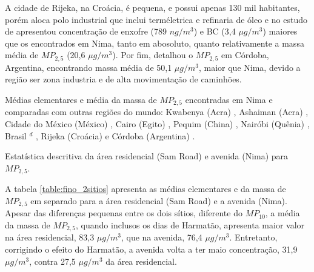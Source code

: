 A cidade de Rijeka, na Croácia, é pequena, e possui apenas 130 mil habitantes, 
porém aloca polo industrial que inclui terméletrica e refinaria de óleo
e no estudo de \citep{ivovsevic2015} apresentou concentração de enxofre
(789 $ng / m^3$) e BC (3,4 $\mu g / m^3$) maiores que os encontrados em Nima, 
tanto em abosoluto, quanto relativamente a massa média de $MP_{2,5}$ 
(20,6 $\mu g / m^3$). 
Por fim, \citet{achad2014} detalhou o $MP_{2,5}$ em Córdoba, Argentina, 
encontrando massa média de 50,1 $\mu g / m^3$, maior que Nima, devido a região
ser zona industria e de alta movimentação de caminhões.   

\begin{landscape}
  \begin{table}[H]
    \centering
    
    \caption{Médias elementares e média da massa de $MP_{2,5}$ encontradas
             em Nima e comparadas com outras regiões do mundo:
             Kwabenya (Acra) \citep{aboh2009},
             Ashaiman (Acra) \citep{ofosu2012},
             Cidade do México (México) \citep{diaz2014},
             Cairo (Egito) \citep{boman2013},
             Pequim (China) \citep{yang2011},
             Nairóbi (Quênia)  \citep{gaita2014},
             Brasil $^d$ \citep{andrade2012urban},
             Rijeka (Croácia) \citep{ivovsevic2015} e
             Córdoba (Argentina) \citep{achad2014}.
             \label{table:fino_in_the_world}}
  \end{table} 
\end{landscape}

\begin{table}[H]
  \centering
    
  \caption{Estatística descritiva da área residencial (Sam Road) e avenida (Nima) 
           para $MP_{2,5}$. \label{table:fino_2sitios}}
\end{table}

A tabela \ref{table:fino_2sitios} apresenta as médias elementares e
da massa de $MP_{2,5}$ em separado para a área residencial (Sam Road) e
a avenida (Nima). Apesar das diferenças pequenas entre os dois sítios, 
diferente do $MP_{10}$, a média da massa de $MP_{2,5}$, quando inclusos os dias
de Harmatão, apresenta maior valor na área residencial, 83,3 $\mu g / m^3$,
que na avenida, 76,4 $\mu g / m^3$. Entretanto, corrigindo o efeito do Harmatão,
a avenida volta a ter maio concentração, 31,9 $\mu g / m^3$, contra 27,5 
$\mu g / m^3$  da área residencial.



